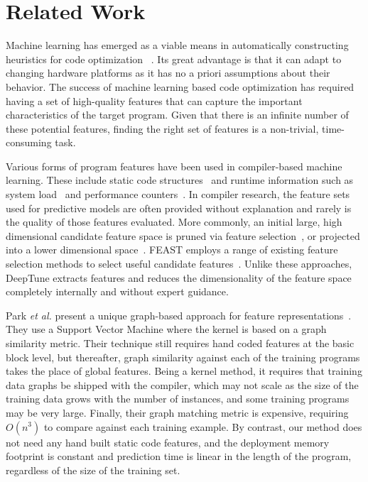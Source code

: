 \section{Related Work}\label{sec:rw}

Machine learning has emerged as a viable means in automatically constructing
heuristics for code optimization%
~\cite{Wang2010,Kulkarni2012,Muralidharan2016,Ogilvie2017,Ren,Cummins2016}.
Its great advantage is that it can adapt to changing hardware platforms as it
has no a priori assumptions about their behavior. The success of machine
learning based code optimization has required having a set of high-quality
features that can capture the important characteristics of the target program.
Given that there is an infinite number of these potential features, finding the
right set of features is a non-trivial, time-consuming task.

Various forms of program features have been used in compiler-based machine
learning. These include static code structures~\cite{Jiang2010} and runtime
information such as system load~\cite{Wen2015} and performance
counters~\cite{Dubach2009}. In compiler research, the feature sets used for
predictive models are often provided without explanation and rarely is the
quality of those features evaluated. More commonly, an initial large, high
dimensional candidate feature space is pruned via feature
selection~\cite{Stephenson2005,Taylor}, or projected into a lower dimensional
space~\cite{Collins2013,Dubach2007}. FEAST employs a range of existing feature
selection methods to select useful candidate features~\cite{Ting2016}. Unlike
these approaches, DeepTune extracts features and reduces the dimensionality of
the feature space completely internally and without expert guidance.

Park \emph{et al.} present a unique graph-based approach for feature
representations~\cite{Park2012}. They use a Support Vector Machine where the
kernel is based on a graph similarity metric. Their technique still requires
hand coded features at the basic block level, but thereafter, graph similarity
against each of the training programs takes the place of global features. Being
a kernel method, it requires that training data graphs be shipped with the
compiler, which may not scale as the size of the training data grows with the
number of instances, and some training programs may be very large. Finally,
their graph matching metric is expensive, requiring $O(n^3)$ to compare against
each training example. By contrast, our method does not need any hand built
static code features, and the deployment memory footprint is constant and
prediction time is linear in the length of the program, regardless of the size
of the training set.

